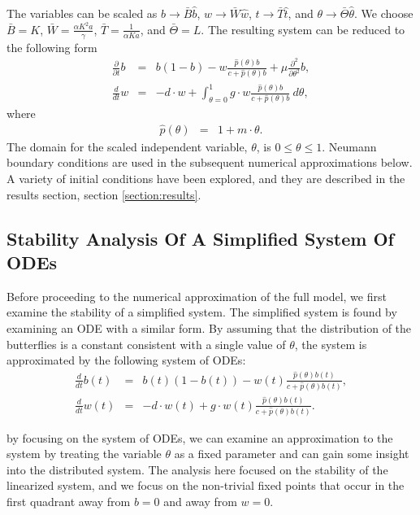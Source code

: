 \documentclass[12pt]{article}
\begin{document}
The variables can be scaled as $b\rightarrow \bar{B}\hat{b}$,
$w\rightarrow \bar{W}\hat{w}$, $t\rightarrow \bar{T}\hat{t}$, and
$\theta\rightarrow \bar{\Theta}\hat{\theta}$. We choose $\bar{B}=K$,
$\bar{W}=\frac{\alpha K^2 a}{\gamma}$, $\bar{T}=\frac{1}{\alpha K a}$,
and $\bar{\Theta}=L$. The resulting system can be reduced to the
following form
\begin{eqnarray}
  \label{eq:scaledodePDE1}
  \frac{\partial}{\partial t} b & = &
      b (1 - b)
      -  w \frac{\hat{p}(\theta) b}{c+\hat{p}(\theta)b}
      + \mu \frac{\partial^2}{\partial \theta^2} b , \\
  \label{eq:scaledodePDE2}
  \frac{d}{dt} w & = & -d \cdot w +
      \int^1_{\theta=0} g \cdot w \frac{\hat{p}(\theta) b }{c + \hat{p}(\theta) b} ~ d\theta,
\end{eqnarray}
where
\begin{eqnarray}
  \hat{p}(\theta) & = & 1 + m \cdot \theta.
\end{eqnarray}
The domain for the scaled independent variable, $\theta$, is
$0\leq\theta\leq 1$.  Neumann boundary conditions are used in the
subsequent numerical approximations below. A variety of initial
conditions have been explored, and they are described in the results
section, section \ref{section:results}.


\subsection{Stability Analysis Of A Simplified System Of ODEs}

Before proceeding to the numerical approximation of the full model, we
first examine the stability of a simplified system. The simplified
system is found by examining an ODE with a similar form. By assuming
that the distribution of the butterflies is a constant consistent with
a single value of $\theta$, the system is approximated by the
following system of ODEs:
\begin{eqnarray}
  \label{eq:scaledODE1}
  \frac{d}{dt} b(t) & = &
      b(t) (1 - b(t))
      -  w(t) \frac{\hat{p}(\theta) b(t)}{c+\hat{p}(\theta)b(t)}, \\
  \label{eq:scaledODE2}
  \frac{d}{dt} w(t) & = & -d \cdot w(t) +
       g \cdot w(t) \frac{\hat{p}(\theta) b(t) }{c + \hat{p}(\theta) b(t)}.
\end{eqnarray}

by focusing on the system of ODEs, we can examine an approximation to
the system by treating the variable $\theta$ as a fixed parameter and
can gain some insight into the distributed system. The analysis here
focused on the stability of the linearized system, and we focus on the
non-trivial fixed points that occur in the first quadrant away from
$b=0$ and away from $w=0$.
\end{document}
